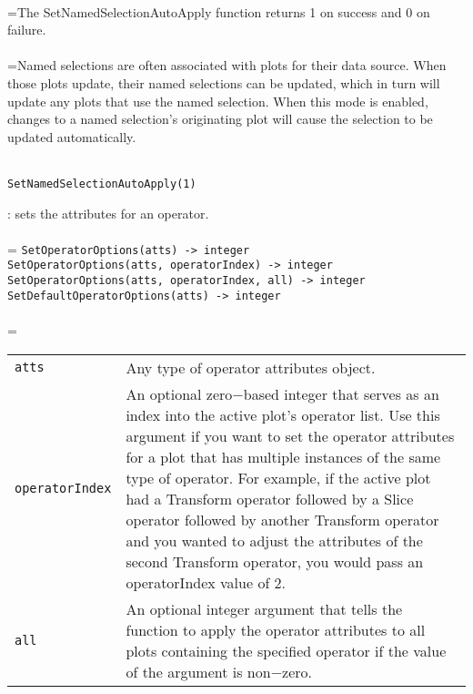 \documentclass[10pt,a4paper]{report}
\begin{document}
 \\ 
\hangindent=\parindent The SetNamedSelectionAutoApply function returns 1 on success and 0 on failure. \\[-3mm] 

 \\ 
\hangindent=\parindent Named selections are often associated with plots for their data source. When those plots update, their named selections can be updated, which in turn will update any plots that use the named selection. When this mode is enabled, changes to a named selection's originating plot will cause the selection to be updated automatically. \\[-3mm] 

\\[-6mm]
\begin{verbatim}SetNamedSelectionAutoApply(1)
\end{verbatim}
\newpage


{}
: sets the attributes for an operator.\\[-3mm]

 \\ 
\hangindent=\parindent 
\verb!SetOperatorOptions(atts) -> integer!\\ 
\verb!SetOperatorOptions(atts, operatorIndex) -> integer!\\ 
\verb!SetOperatorOptions(atts, operatorIndex, all) -> integer!\\ 
\verb!SetDefaultOperatorOptions(atts) -> integer!\\ [-3mm]

 \\ 
\hangindent=\parindent 
\begin{tabular}{lp{9cm}}
\verb!atts! & Any type of operator attributes object. \\
\verb!operatorIndex! & An optional zero$-$based integer that serves as an index into the active plot's operator list. Use this argument if you want to set the operator attributes for a plot that has multiple instances of the same type of operator. For example, if the active plot had a Transform operator followed by a Slice operator followed by another Transform operator and you wanted to adjust the attributes of the second Transform operator, you would pass an operatorIndex value of 2. \\
\verb!all! & An optional integer argument that tells the function to apply the operator attributes to all plots containing the specified operator if the value of the argument is non$-$zero. \\
\end{tabular} \\[-2mm]
\end{document}
